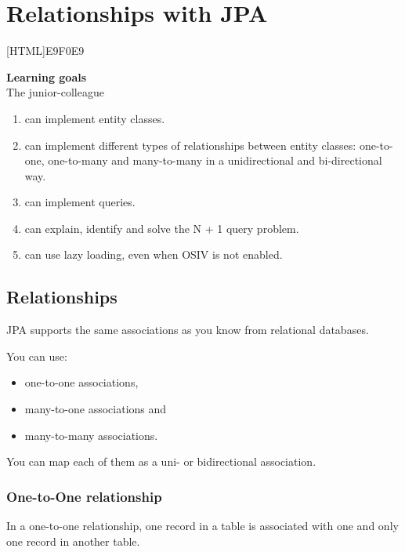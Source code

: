 \chapter{Relationships with JPA}


[HTML]{E9F0E9}{\parbox{\textwidth}{%
\noindent \textbf{Learning goals}\\
The junior-colleague
\begin{enumerate}[nolistsep]
\item can implement entity classes.
\item can implement different types of relationships between entity classes: one-to-one, one-to-many and many-to-many in a unidirectional and bi-directional way.
\item can implement queries.
\item can explain, identify and solve the N + 1 query problem.
\item can use lazy loading, even when OSIV is not enabled.
\end{enumerate}}}

\section{Relationships}

JPA supports the same associations as you know from relational databases.

 You can use:
\begin{itemize}
\item one-to-one associations,
\item many-to-one associations and
\item many-to-many associations.
\end{itemize}
You can map each of them as a uni- or bidirectional association.


\subsection{One-to-One relationship}

In a one-to-one relationship, one record in a table is associated with one and only one record in another table.

